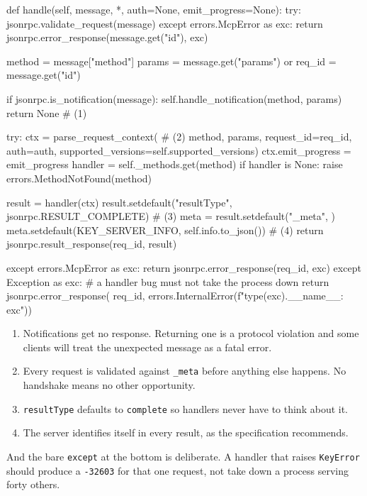 \begin{py}
def handle(self, message, *, auth=None, emit_progress=None):
    try:
        jsonrpc.validate_request(message)
    except errors.McpError as exc:
        return jsonrpc.error_response(message.get("id"), exc)

    method = message["method"]
    params = message.get("params") or {}
    req_id = message.get("id")

    if jsonrpc.is_notification(message):
        self.handle_notification(method, params)
        return None                                    # (1)

    try:
        ctx = parse_request_context(                   # (2)
            method, params, request_id=req_id, auth=auth,
            supported_versions=self.supported_versions)
        ctx.emit_progress = emit_progress
        handler = self._methods.get(method)
        if handler is None:
            raise errors.MethodNotFound(method)

        result = handler(ctx)
        result.setdefault("resultType", jsonrpc.RESULT_COMPLETE)   # (3)
        meta = result.setdefault("_meta", {})
        meta.setdefault(KEY_SERVER_INFO, self.info.to_json())      # (4)
        return jsonrpc.result_response(req_id, result)

    except errors.McpError as exc:
        return jsonrpc.error_response(req_id, exc)
    except Exception as exc:  # a handler bug must not take the process down
        return jsonrpc.error_response(
            req_id, errors.InternalError(f"{type(exc).__name__}: {exc}"))
\end{py}

\begin{enumerate}[leftmargin=1.6em, itemsep=3pt]
\item Notifications get no response. Returning one is a protocol violation and
some clients will treat the unexpected message as a fatal error.
\item Every request is validated against \texttt{\_meta} before anything else
happens. No handshake means no other opportunity.
\item \texttt{resultType} defaults to \texttt{complete} so handlers never have to
think about it.
\item The server identifies itself in every result, as the specification
recommends.
\end{enumerate}

And the bare \texttt{except} at the bottom is deliberate. A handler that raises
\texttt{KeyError} should produce a \texttt{-32603} for that one request, not take
down a process serving forty others.

